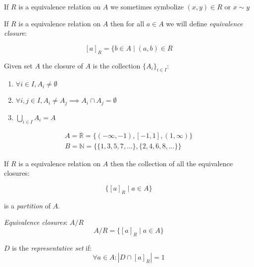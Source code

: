 \documentclass[00_complete]{subfiles}
\begin{document}
\begin{symbols}
If $R$ is a equivalence relation on $A$ we sometimes symbolize $(x,y) \in R$ or
$x \sim y$
\end{symbols}

\begin{definition}
If $R$ is a equivalence relation on $A$ then for all $a \in A$ we will define
\emph{equivalence closure}:

$$[a]_R = \{b \in A \mid (a,b) \in R$$

Given set $A$ the closure of $A$ is the collection $\{A_i\}_{i \in I}$:
\begin{enumerate}
\item $\forall i \in I, A_i \neq \emptyset$
\item $\forall i,j \in I, A_i \neq A_j \implies A_i \cap A_j = \emptyset$
\item $\displaystyle \bigcup_{i \in I}A_i=A$
\end{enumerate}
\end{definition}

\begin{example}
$$
\begin{gathered}
    A = \mathbb{R} = \{(-\infty, -1), [-1,1], (1,\infty)\} \\
    B = \mathbb{N} = \{\{1,3,5,7,\ldots\},\{2,4,6,8,\ldots\}\}
\end{gathered}
$$
\end{example}

\begin{claim}
If $R$ is a equivalence relation on $A$ then the collection of all the
equivalence closures:

$$\{[a]_R \mid a \in A \}$$

is a \emph{partition} of $A$.
\end{claim}

\begin{symbols}
\emph{Equivalence closures}: $A/R$
$$A/R  = \{[a]_R \mid a \in A\}$$

$D$ is the \emph{representative set} if:
$$\forall a \in A: |D \cap [a]_R| = 1$$
\end{symbols}
\end{document}
